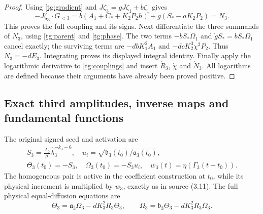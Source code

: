 \begin{proof}
Using \eqref{tg:gradient} and
$J\zeta_3=gJ\zeta_1+b\zeta_1$ gives
\[
 -J\zeta_3\cdot G_{<3}
 =b(A_1+C_*+K_2P_2h)+g(S_*-aK_2P_2)=N_3.
\]
This proves the full coupling and its signs. Next differentiate the
three summands of $N_3$, using \eqref{tg:parent} and
\eqref{tg:phase}. The two terms
$-bS_*\Omega_1$ and $\dot gS_*=bS_*\Omega_1$ cancel exactly;
the surviving terms are $-dbK_1^2A_1$ and
$-dcK_2^3\chi^2P_2$. Thus $\dot N_3=-dE_3$.
Integrating proves its displayed integral identity. Finally apply
the logarithmic derivative to \eqref{tg:couplings} and insert
$\dot R_3$, $\dot\chi$ and $\dot N_3$. All logarithms are defined
because their arguments have already been proved positive.
\end{proof}

\subsection{Exact third amplitudes, inverse maps and fundamental functions}

The original signed seed and activation are
\begin{equation}\label{tg:seed}
\begin{gathered}
 S_3=\frac{A_0}{\mu}\widehat\lambda_3^{-k_3-6},\quad
 u_i=\sqrt{\mathfrak b_3(t_0)/\mathfrak a_3(t_0)},\\
 \Theta_3(t_0)=-S_3,\quad \Omega_3(t_0)=-S_3u_i,\quad
 w_3(t)=\eta(\Gamma_3(t-t_0)).
\end{gathered}
\end{equation}
The homogeneous pair is active in the coefficient construction at
$t_0$, while its physical increment is multiplied by $w_3$, exactly
as in source (3.11). The full physical equal-diffusion equations are
\begin{equation}\label{tg:pair}
 \dot\Theta_3=\mathfrak a_3\Omega_3-dK_3^2R_3\Theta_3,
 \qquad
 \dot\Omega_3=\mathfrak b_3\Theta_3-dK_3^2R_3\Omega_3.
\end{equation}

